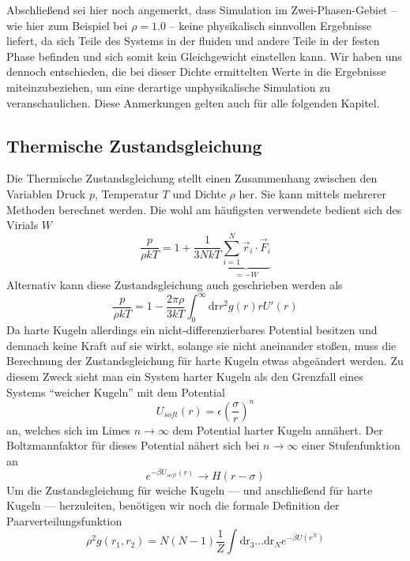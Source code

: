 Abschließend sei hier noch angemerkt, dass Simulation im Zwei-Phasen-Gebiet -- wie hier zum Beispiel bei $\rho = 1.0$ -- keine physikalisch sinnvollen Ergebnisse liefert, da sich Teile des Systems in der fluiden und andere Teile in der festen Phase befinden und sich somit kein Gleichgewicht einstellen kann. Wir haben uns dennoch entschieden, die bei dieser Dichte ermittelten Werte in die Ergebnisse miteinzubeziehen, um eine derartige unphysikalische Simulation zu veranschaulichen. Diese Anmerkungen gelten auch für alle folgenden Kapitel. 

\subsection{Thermische Zustandsgleichung}
Die Thermische Zustandsgleichung stellt einen Zusammenhang zwischen den Variablen Druck $p$, Temperatur $T$ und Dichte $\rho$ her. Sie kann mittels mehrerer Methoden berechnet werden. Die wohl am häufigsten verwendete bedient sich des Virials $W$  
\begin{equation}
\frac{p}{\rho k T} = 1 + \frac{1}{3NkT}\underbrace{\sum_{i=1}^N \vec{r}_i \cdot \vec{F}_i}_{= - W}
\end{equation}
Alternativ kann diese Zustandsgleichung auch geschrieben werden als 
\begin{equation}
\frac{p}{\rho k T} = 1 - \frac{2\pi\rho}{3kT} \int_0^{\infty} \text{dr} r^2 g(r) r U'(r)  
\label{eos2}
\end{equation}
Da harte Kugeln allerdings ein nicht-differenzierbares Potential besitzen und demnach keine Kraft auf sie wirkt, solange sie nicht aneinander stoßen, muss die Berechnung der Zustandsgleichung für harte Kugeln etwas abgeändert werden.
Zu diesem Zweck sieht man ein System harter Kugeln als den Grenzfall eines Systems "`weicher Kugeln"' \cite{Hansen1986} mit dem Potential 
\begin{equation}
U_{soft}(r) = \epsilon \left(\frac{\sigma}{r}\right)^n 
\end{equation}
an, welches sich im Limes $n \rightarrow \infty$ dem Potential harter Kugeln annähert. Der Boltzmannfaktor für dieses Potential nähert sich bei $n \rightarrow \infty$ einer Stufenfunktion an
\begin{equation}
e^{-\beta U_{soft}(r)} \rightarrow H(r-\sigma)
\end{equation} 
Um die Zustandsgleichung für weiche Kugeln --- und anschließend für harte Kugeln --- herzuleiten, benötigen wir noch die formale Definition der Paarverteilungsfunktion
\begin{equation}
\rho^2 g(r_1, r_2) = N(N-1) \frac{1}{Z} \int \text{dr}_3 \ldots \text{dr}_N e^{-\beta U(r^N)}
\end{equation}
